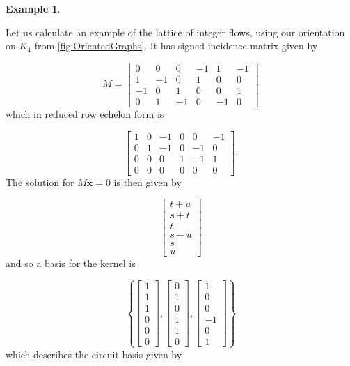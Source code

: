 \documentclass[12pt]{report}
\theoremstyle{definition}
\newtheorem{example}[theorem]{Example}
\theoremstyle{upright}
\begin{document}
\begin{example}\label{ex:LatticeOfIntegerFlows}

    Let us calculate an example of the lattice of integer flows, using our orientation on $K_4$ from \cref{fig:OrientedGraphs}.
    It has signed incidence matrix given by
    
    \[M=\begin{bmatrix}
        0 & 0 & 0 & -1 & 1 & -1\\
        1 & -1 & 0 & 1 & 0 & 0\\
        -1 & 0 & 1 & 0 & 0 & 1\\
        0 & 1 & -1 & 0 & -1 & 0
    \end{bmatrix}\]
    which in reduced row echelon form is

    \[\begin{bmatrix}
        1 & 0 & -1 & 0 & 0 & -1\\
        0 & 1 & -1 & 0 & -1 & 0\\
        0 & 0 & 0 & 1 & -1 & 1\\
        0 & 0 & 0 & 0 & 0 & 0
    \end{bmatrix}.\]
    The solution for $M\mathbf{x}=0$ is then given by

    \[\begin{bmatrix}
        t+u\\
        s+t\\
        t\\
        s-u\\
        s\\
        u
    \end{bmatrix}\]
    and so a basis for the kernel is

    \[\left\{\begin{bmatrix}
        1\\
        1\\
        1\\
        0\\
        0\\
        0
    \end{bmatrix}, \begin{bmatrix}
        0\\
        1\\
        0\\
        1\\
        1\\
        0
    \end{bmatrix}, \begin{bmatrix}
        1\\
        0\\
        0\\
        -1\\
        0\\
        1
    \end{bmatrix}\right\}\]
    which describes the circuit basis given by


\end{example}
\end{document}
